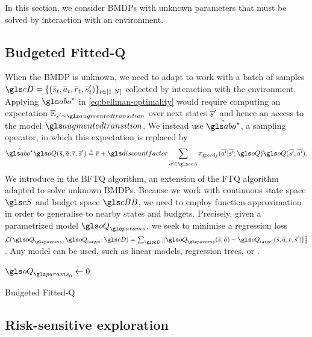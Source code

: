 \label{sec:brl}

In this section, we consider \glspl{BMDP} with unknown parameters that must be solved by interaction with an environment. 

\subsection{Budgeted Fitted-Q}
\label{subsec:bftq}

When the \gls{BMDP} is unknown, we need to adapt  to work with a batch of samples $\cD=\{(\os_t,\oa_t,\overline{r}_t,\os_t')\}_{t\in [1,N]}$ collected by interaction with the environment. Applying $\abo^{\star}$ in \eqref{eq:bellman-optimality} would require computing an expectation $\expectedvalue_{\os'\sim \augmentedtransition}$ over next states $\overline{s}'$ and hence an access to the model $\augmentedtransition$. We instead use $\hat{\abo^{\star}}$, a sampling operator, in which this expectation is replaced by
\begin{equation*}
\hat{\abo^{\star}} \oQ(\os, \oa, \overline{r}, \os') \eqdef \overline{r} + \discount \sum_{\ov{a'}\in \ocA} \pi_\text{greedy}(\ov{a'}|\ov{s'}; \oQ) \oQ(\ov{s'}, \ov{a'}).
\end{equation*}
We introduce in  the \gls{BFTQ} algorithm, an extension of the \gls{FTQ} algorithm adapted to solve unknown \glspl{BMDP}. Because we work with continuous state space $\cS$ and budget space $\budgetspace$, we need to employ function-approximation in order to generalise to nearby states and budgets. Precisely, given a parametrized model $\oQ_\params$, we seek to minimise a regression loss $\cL(\oQ_\params, \oQ_\text{target};\cD) = \sum_{\cD} \|\oQ_\params(\os, \oa) - \oQ_\text{target}(\os, \oa, r, \os')\|_2^2$.
Any model can be used, such as linear models, regression trees, or .

\begin{algorithm}[ht]
	\DontPrintSemicolon
	\KwData{$\cD$}
	$\oQ_{\params_0} \leftarrow 0$\;
	\caption{Budgeted Fitted-Q}
	\label{algo:bftq}
\end{algorithm}

\subsection{Risk-sensitive exploration}
\label{sec:exploration}

